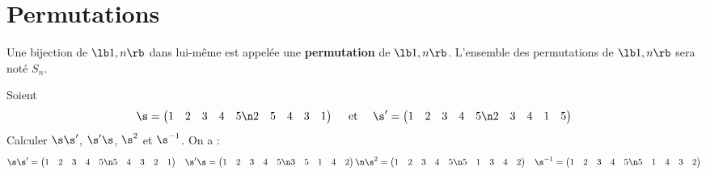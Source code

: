 \documentclass[11pt]{article}
\begin{document}


\section{Permutations}

\begin{defi}{}{}
    Une bijection de $\lb 1,n \rb$ dans lui-même est appelée une \textbf{permutation} de $\lb 1,n \rb$.\n
    L'ensemble des permutations de $\lb 1,n \rb$ sera noté $S_n$.
\end{defi}

\begin{ex}{}{}
    Soient
    \begin{equation*}
        \s=\begin{pmatrix}
            1&2&3&4&5\n
            2&5&4&3&1
        \end{pmatrix} \quad \text{ et } \quad
        \s'=\begin{pmatrix}
            1&2&3&4&5\n
            2&3&4&1&5
        \end{pmatrix}
    \end{equation*}
    Calculer $\s\s'$, $\s'\s$, $\s^2$ et $\s^{-1}$.
    \tcblower
    On a :
    \begin{align*}
        \s\s' &= \begin{pmatrix}
            1 & 2 & 3 & 4 & 5 \n
            5 & 4 & 3 & 2 & 1
        \end{pmatrix}
        &\s'\s = \begin{pmatrix}
            1 & 2 & 3 & 4 & 5 \n
            3 & 5 & 1 & 4 & 2
        \end{pmatrix}\n
        \s^2 &= \begin{pmatrix}
            1&2&3&4&5\n
            5&1&3&4&2
        \end{pmatrix}
        &\s^{-1} = \begin{pmatrix}
            1&2&3&4&5\n
            5&1&4&3&2
        \end{pmatrix}
    \end{align*}
\end{ex}
\end{document}
